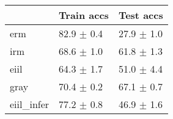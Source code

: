 \begin{tabular}{lll}
\toprule
{} &      Train accs &       Test accs \\
\midrule
erm        &  82.9 $\pm$ 0.4 &  27.9 $\pm$ 1.0 \\
irm        &  68.6 $\pm$ 1.0 &  61.8 $\pm$ 1.3 \\
eiil       &  64.3 $\pm$ 1.7 &  51.0 $\pm$ 4.4 \\
gray       &  70.4 $\pm$ 0.2 &  67.1 $\pm$ 0.7 \\
eiil_infer &  77.2 $\pm$ 0.8 &  46.9 $\pm$ 1.6 \\
\bottomrule
\end{tabular}

